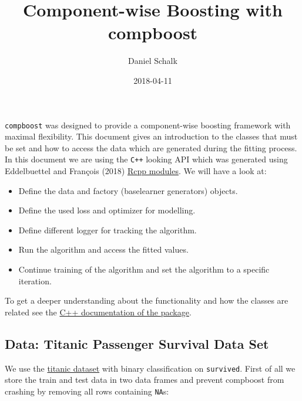 \documentclass[]{article}
\title{Component-wise Boosting with compboost}
\author{Daniel Schalk}
\date{2018-04-11}
\providecommand{\tightlist}{%
  \setlength{\itemsep}{0pt}\setlength{\parskip}{0pt}}
\begin{document}
\maketitle

\texttt{compboost} was designed to provide a component-wise boosting
framework with maximal flexibility. This document gives an introduction
to the classes that must be set and how to access the data which are
generated during the fitting process. In this document we are using the
\texttt{C++} looking API which was generated using Eddelbuettel and
François (2018)
\href{https://cran.r-project.org/web/packages/Rcpp/vignettes/Rcpp-modules.pdf}{Rcpp
modules}. We will have a look at:

\begin{itemize}
\tightlist
\item
  Define the data and factory (baselearner generators) objects.
\item
  Define the used loss and optimizer for modelling.
\item
  Define different logger for tracking the algorithm.
\item
  Run the algorithm and access the fitted values.
\item
  Continue training of the algorithm and set the algorithm to a specific
  iteration.
\end{itemize}

To get a deeper understanding about the functionality and how the
classes are related see the
\href{https://schalkdaniel.github.io/compboost/cpp_man/html/index.html}{C++
documentation of the package}.

\subsection{Data: Titanic Passenger Survival Data
Set}\label{data-titanic-passenger-survival-data-set}

We use the \href{https://www.kaggle.com/c/titanic/data}{titanic dataset}
with binary classification on \texttt{survived}. First of all we store
the train and test data in two data frames and prevent compboost from
crashing by removing all rows containing \texttt{NA}s:
\end{document}
